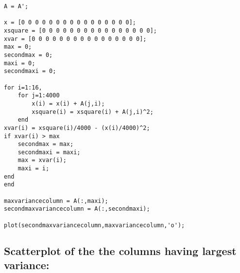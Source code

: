 \documentclass{article}
\begin{document}
\begin{scriptsize}
\begin{lstlisting}
A = A';

x = [0 0 0 0 0 0 0 0 0 0 0 0 0 0 0 0];
xsquare = [0 0 0 0 0 0 0 0 0 0 0 0 0 0 0 0];
xvar = [0 0 0 0 0 0 0 0 0 0 0 0 0 0 0 0];
max = 0;
secondmax = 0;
maxi = 0;
secondmaxi = 0;

for i=1:16,
    for j=1:4000
        x(i) = x(i) + A(j,i);
        xsquare(i) = xsquare(i) + A(j,i)^2;
    end
xvar(i) = xsquare(i)/4000 - (x(i)/4000)^2;
if xvar(i) > max
    secondmax = max;
    secondmaxi = maxi;
    max = xvar(i);
    maxi = i;
end
end

maxvariancecolumn = A(:,maxi);
secondmaxvariancecolumn = A(:,secondmaxi);

plot(secondmaxvariancecolumn,maxvariancecolumn,'o');
\end{lstlisting}


\subsection*{Scatterplot of the the columns having largest variance:}






\end{scriptsize}
\end{document}
